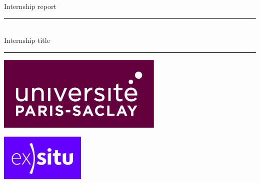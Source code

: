 \begin{task}
    \begin{gridlayout}{\textwidth}{15cm}
        \begin{row}{0.1}
            \begin{cell}{1}
                \centering
                Internship report
            \end{cell}
        \end{row}
        \begin{row}{0.1}
            \begin{cell}{1}
            \end{cell}
        \end{row}
        \begin{row}{0.1}
            \begin{cell}{1}
                \centering
                \rule{0.6\cellwidth}{0.4pt}\\[1.5ex]
                {\Large Internship title}\\
                \rule{0.6\cellwidth}{0.4pt}
            \end{cell}
        \end{row}
        \begin{row}{0.45}
            \begin{cell}{1}
            \end{cell}
        \end{row}
        \begin{row}{0.25}
            \begin{cell}{0.5}
                \centering
                \includegraphics[width=\cellwidth]{doc-two/img/logo-univ-ps.png}
            \end{cell}
            \begin{cell}{0.5}
                \centering
                \includegraphics[width=\cellwidth]{doc-two/img/logo-ex-situ.png}
            \end{cell}
        \end{row}
    \end{gridlayout}
\logoguidesofdoctwo
\end{task}

\newpage
